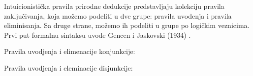 \documentclass[a4paper,10pt]{article}
\theoremstyle{definition}
\begin{document}
Intuicionistička pravila prirodne dedukcije predstavljaju kolekciju pravila zaključivanja, koja možemo podeliti u dve grupe: pravila uvođenja i pravila eliminisanja. Sa druge strane, možemo ih podeliti u grupe po logičkim veznicima. Prvi put formalnu sintaksu uvode Gencen i Jaskovski (1934) \cite{gentzen35, jaskowski34}.

Pravila uvodjenja i elimenacije konjunkcije:
\begin{center}
    \begin{minipage}{\textwidth}
        \begin{prooftree}[$\land_I$]
        \end{prooftree}
    \end{minipage}
    \begin{minipage}{0.3\textwidth}
        \begin{prooftree}[$\land_{E1}$]
        \end{prooftree}
    \end{minipage}
    \begin{minipage}{0.3\textwidth}
        \begin{prooftree}[$\land_{E2}$]
        \end{prooftree}
    \end{minipage}
\end{center}

Pravila uvodjenja i eleminacije disjunkcije:

\begin{center}
    \begin{minipage}{0.3\textwidth}
        \begin{prooftree}[$\lor_{I1}$]
        \end{prooftree}
    \end{minipage}
    \begin{minipage}{0.3\textwidth}
        \begin{prooftree}[$\lor_{I1}$]
        \end{prooftree}
    \end{minipage}
    \begin{minipage}{\textwidth}
        \begin{prooftree}[$\lor_{E}$]
        \end{prooftree}
    \end{minipage}
\end{center}
\end{document}

